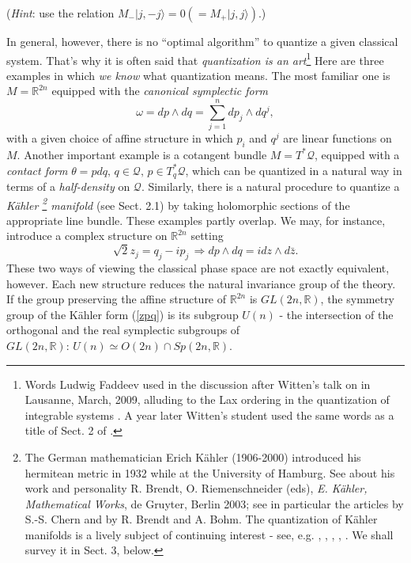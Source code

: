 \documentclass[12pt]{article}
\begin{document}
({\it Hint}: use the relation $M_- |j, -j\rangle = 0 (= M_+|j, j\rangle)$.)

In general, however, there is no ``optimal algorithm'' to quantize a given
classical system. That's why it is often said that {\it quantization is an art}\footnote{Words Ludwig Faddeev used in the discussion after Witten's talk on \cite{GW} in Lausanne, March, 2009, alluding to the Lax ordering in the quantization of integrable systems \cite{F}. A year later Witten's student used the same words as a title of Sect. 2 of \cite{G10}.} Here are three examples in which {\it we know}
what quantization means. The most familiar one is $M = {\mathbb R}^{2n}$
equipped with the {\it canonical symplectic form}
\begin{equation}
\label{dpdq}
\omega = dp\wedge dq = \sum_{j=1}^n dp_j\wedge dq^j,
\end{equation}
with a given choice of affine structure in which $p_i$ and $q^j$ are linear
functions on $M$. Another important example is a cotangent bundle $M = 
T^*{\mathcal Q}$, equipped with a {\it contact form} $\theta = p dq, \, 
q\in{\mathcal Q}, \, p\in T^*_q {\mathcal Q}$, which can be quantized in a natural
 way in terms of a {\it half-density} on ${\mathcal Q}$. Similarly, there is a 
natural procedure to quantize a {\it K\"ahler \footnote{The German mathematician Erich
 K\"ahler (1906-2000) introduced his hermitean metric in 1932 while at the 
University of Hamburg. See about his work and personality R. Brendt, O. 
Riemenschneider (eds), {\it E. K\"ahler, Mathematical Works}, de Gruyter, Berlin
2003; see in particular the articles by S.-S. Chern and by R. Brendt and A.
Bohm. The quantization of K\"ahler manifolds is a lively subject of
continuing interest - see, e.g. \cite{AdPW}, \cite{Hi}, \cite{GW}, \cite{W10},
\cite{G10}. We shall survey it in Sect. 3, below.} manifold} (see Sect. 2.1) 
by taking holomorphic sections of the appropriate line 
bundle. These examples partly overlap. We may, for instance, introduce a 
complex structure on ${\mathbb R}^{2n}$ setting
\begin{equation}
\label{zpq}
\sqrt{2} z_j = q_j - i p_j \, \Rightarrow dp\wedge dq = i dz\wedge d{\bar z}.
\end{equation}
These two ways of viewing the classical phase space are not exactly equivalent,
 however. Each new structure reduces the natural invariance group of the theory.
 If the group preserving the affine structure of ${\mathbb R}^{2n}$ is $GL(2n,
{\mathbb R})$, the symmetry group of the K\"ahler form (\ref{zpq}) is its
subgroup $U(n)$ - the intersection of the orthogonal and the real symplectic 
subgroups of $GL(2n, {\mathbb R}): \, U(n)\simeq O(2n)\cap Sp(2n,{\mathbb R})$.
\end{document}
